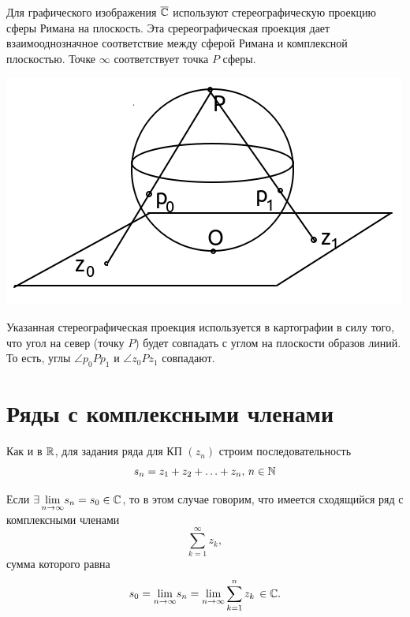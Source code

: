 \documentclass[../../main.tex]{subfiles}
\begin{document}
Для графического изображения $ \overline{\mathbb{C}} $ используют стереографическую 
проекцию сферы Римана на плоскость. Эта сререографическая проекция дает 
взаимооднозначное соответствие между сферой Римана и комплексной плоскостью. 
Точке $ \infty $ соответствует точка $P$ сферы.

\begin{center}
	\includegraphics[scale = 0.8]{lec24_1} 
\end{center}

Указанная стереографическая проекция используется в картографии в силу того, 
что угол на север (точку $P$) будет совпадать с углом на плоскости образов 
линий. То есть, углы $\angle p_0Pp_1$ и $\angle z_0Pz_1$ совпадают.

\section{Ряды с комплексными членами}

Как и в $ \mathbb{R} $, для задания ряда для КП $ (z_n) $ строим последовательность 
\begin{equation}\label{24:6}
	s_n = z_1 + z_2 + \ldots + z_n,\, n \in \mathbb{N}
\end{equation}

Если $ \exists\, \underset{n \to \infty}{\lim} s_n = s_0 \in \mathbb{C} $, то в этом 
случае говорим, что имеется сходящийся ряд с комплексными членами
\begin{equation}\label{24:7}
	\sum_{k=1}^{\infty}z_k,
\end{equation}
сумма которого равна
\begin{equation}\label{24:8}
	s_0 = \underset{n \to \infty}{\lim} s_n = \underset{n \to \infty}{\lim} 
	\sum_{k=1}^{n}z_k\, \in \mathbb{C}.
\end{equation}
\end{document}
